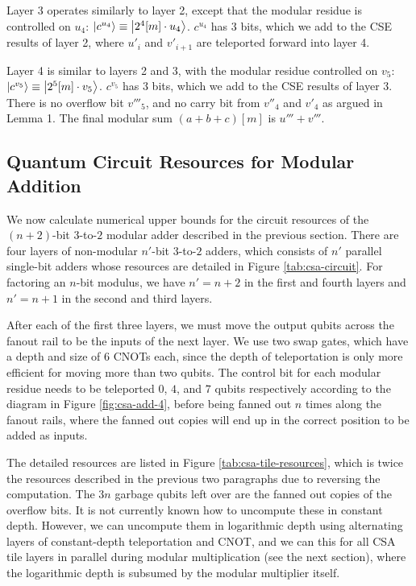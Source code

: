 \documentclass[twoside]{article}
\begin{document}
Layer 3
operates similarly to layer 2, except that the modular residue is controlled on
$u_4$:
$\left\vert{c^{u_4}}\right\rangle \equiv \left\vert{2^4[m] \cdot u_4}\right\rangle$.
$c^{u_4}$ has $3$ bits, which we
add to the CSE results of layer 2, where $u'_i$ and $v'_{i+1}$ are teleported
forward into layer 4.

Layer 4
is similar to layers 2 and 3, with the modular residue controlled on $v_5$:
$\left\vert{c^{v_5}}\right\rangle \equiv \left\vert{2^5[m] \cdot v_5}\right\rangle$.
$c^{v_5}$ has $3$ bits, which we
add to the CSE results of layer 3.
There is no overflow bit $v'''_5$, and no carry bit from $v''_4$ and $v'_4$
as argued in Lemma 1.
The final modular sum $(a+b+c)[m]$ is $u'''+v'''$.

\subsection{Quantum Circuit Resources for Modular Addition}

We now calculate numerical upper bounds for the circuit resources of
the $(n+2)$-bit $3$-to-$2$ modular adder described in the previous section.
There are four layers of non-modular $n'$-bit $3$-to-$2$ adders, which
consists of $n'$ parallel single-bit adders whose
resources are detailed in Figure \ref{tab:csa-circuit}. For factoring
an $n$-bit modulus, we have $n'=n+2$ in the first and fourth layers
and $n'=n+1$ in the second and third layers.

After each of the first three layers, we must move the output qubits
across the fanout rail to be the inputs of the next layer. We use
two swap gates, which have a depth and size of $6$ CNOTs each, since
the depth of teleportation is only more efficient for moving more than
two qubits. The control bit for each modular residue needs to be
teleported $0$, $4$, and $7$ qubits respectively according to the
diagram in Figure \ref{fig:csa-add-4}, before being fanned out $n$
times along the fanout rails, where the fanned out copies will end up
in the correct position to be added as inputs.

The detailed resources are listed in Figure \ref{tab:csa-tile-resources},
which is twice the resources described in the previous two paragraphs due
to reversing the computation.
The $3n$ garbage qubits left over are
the fanned out copies of the overflow bits.
It is not currently known how to uncompute these in constant depth.
However, we can uncompute them in logarithmic depth using alternating
layers of constant-depth teleportation and CNOT, and we can this for all
CSA tile layers in parallel during modular multiplication (see the next
section), where the logarithmic depth is subsumed by the modular multiplier
itself.
\end{document}
